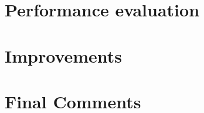 \documentclass[11pt]{article}
\begin{document}
\section{Performance evaluation}
\label{sec:performance}

\section{Improvements}
\label{sec:improvements}

\section{Final Comments}
\label{sec:final_comments}




\end{document}
